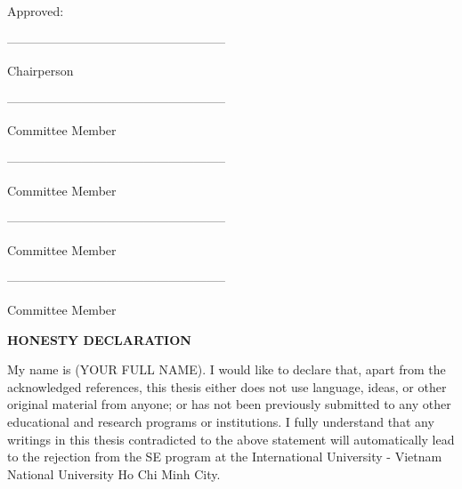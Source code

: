 \vspace{2cm}
\noindent Approved:

\begin{flushright}
    \begin{minipage}{7.5cm}
        \raggedright
        -----------------------------------------------------
        \vspace{-0.6cm}
        
        Chairperson

        \vspace{1.75cm}

        -----------------------------------------------------
        \vspace{-0.6cm}
        
        Committee Member

        \vspace{1.75cm}
        
        -----------------------------------------------------
        \vspace{-0.6cm}
        
        Committee Member
        
        \vspace{1.75cm}

        -----------------------------------------------------
        \vspace{-0.6cm}

        Committee Member
        
        \vspace{1.75cm}

        -----------------------------------------------------
        \vspace{-0.6cm}

        Committee Member
    \end{minipage}
\end{flushright}


\newpage
\begin{center}
    \fontsize{14}{16}\selectfont
    \textbf{HONESTY DECLARATION}
\end{center}
\vspace{0.5cm}
\doublespacing
\justifying
My name is (YOUR FULL NAME).  I would like to declare that, apart from the acknowledged references, this 
thesis either does not use language, ideas, or other original material from anyone; or has not been previously submitted 
to any other educational and research programs or institutions. I fully understand that any writings in this thesis 
contradicted to the above statement will automatically lead to the rejection from the SE program at the International 
University - Vietnam National University Ho Chi Minh City.
\vspace{5cm}

